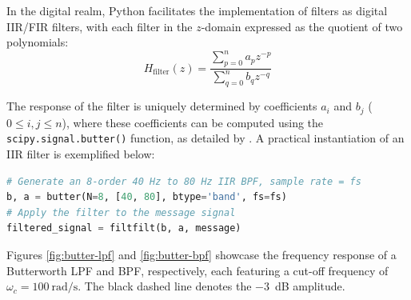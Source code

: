\documentclass[../ECE459FinalProjectReport.tex]{subfiles}
\begin{document}
In the digital realm, Python facilitates the implementation of filters as digital IIR/FIR filters, with each filter in the $z$-domain expressed as the quotient of two polynomials:
\begin{equation}
H_{\text{filter}}(z) = \frac{\sum_{p=0}^{n}{a_pz^{-p}}}{\sum_{q=0}^{n}{b_qz^{-q}}}
\end{equation}

The response of the filter is uniquely determined by coefficients $a_i$ and $b_j$ ($0 \leq i, j \leq n$), where these coefficients can be computed using the \verb|scipy.signal.butter()| function, as detailed by \cite{thescipycommunityScipySignalButter, thescipycommunityScipySignalFiltfilt, thescipycommunityScipySignalLfilter}. A practical instantiation of an IIR filter is exemplified below:
\begin{lstlisting}[language=python]
# Generate an 8-order 40 Hz to 80 Hz IIR BPF, sample rate = fs
b, a = butter(N=8, [40, 80], btype='band', fs=fs)
# Apply the filter to the message signal
filtered_signal = filtfilt(b, a, message)
\end{lstlisting}

Figures \ref{fig:butter-lpf} and \ref{fig:butter-bpf} showcase the frequency response of a Butterworth LPF and BPF, respectively, each featuring a cut-off frequency of $\omega_c = \SI{100}{\radian\per\s}$. The black dashed line denotes the \SI{-3}{\dB} amplitude.
\end{document}
